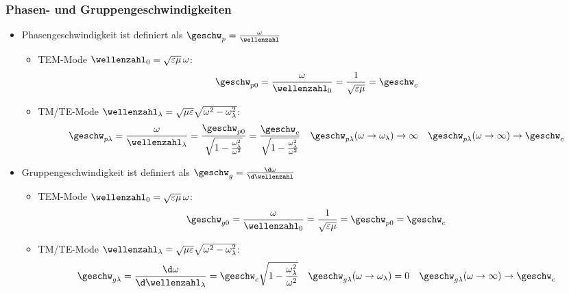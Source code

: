 \begin{frame}
  \frametitle{Phasen- und Gruppengeschwindigkeiten}
  \begin{itemize}[<+->]
  \item \alert{Phasengeschwindigkeit} ist definiert als \(\geschw_p = \frac{\omega}{\wellenzahl}\)
    \begin{itemize}[<+->]
    \item TEM-Mode \(\wellenzahl_0=\sqrt{\varepsilon\mu}\, \omega\): 
      \begin{equation*}
        \geschw_{p0} = \frac{\omega}{\wellenzahl_0} = \frac{1}{\sqrt{\varepsilon\mu}} = \geschw_c
        \end{equation*}
      \item TM/TE-Mode \(\wellenzahl_\lambda=\sqrt{\mu\varepsilon}\sqrt{\omega^2-\omega_\lambda^2}\):
      \begin{equation*}
        \geschw_{p\lambda} = \frac{\omega}{\wellenzahl_\lambda} = \frac{\geschw_{p0}}{\sqrt{1-\frac{\omega_\lambda^2}{\omega^2}}} = \frac{\geschw_{c}}{\sqrt{1-\frac{\omega_\lambda^2}{\omega^2}}}\quad \geschw_{p\lambda}(\omega\to\omega_\lambda)\to\infty \quad \geschw_{p\lambda}(\omega\to\infty)\to\geschw_c 
        \end{equation*}
        
  \end{itemize}
  \item \alert{Gruppengeschwindigkeit} ist definiert als \(\geschw_g = \frac{\d \omega}{\d \wellenzahl}\)
    \begin{itemize}[<+->]
    \item TEM-Mode \(\wellenzahl_0=\sqrt{\varepsilon\mu}\, \omega\): 
      \begin{equation*}
        \geschw_{g0} = \frac{\omega}{\wellenzahl_0} = \frac{1}{\sqrt{\varepsilon\mu}} = \geschw_{p0}=\geschw_c
        \end{equation*}
      \item TM/TE-Mode \(\wellenzahl_\lambda=\sqrt{\mu\varepsilon}\sqrt{\omega^2-\omega_\lambda^2}\):
      \begin{equation*}
        \geschw_{g\lambda} = \frac{\d \omega}{\d \wellenzahl_\lambda} = \geschw_{c} \sqrt{1-\frac{\omega_\lambda^2}{\omega^2}} \quad \geschw_{g\lambda}(\omega\to\omega_\lambda)=0 \quad \geschw_{g\lambda}(\omega\to\infty)\to\geschw_c 
        \end{equation*}
        
  \end{itemize}
  \end{itemize}
\end{frame}


